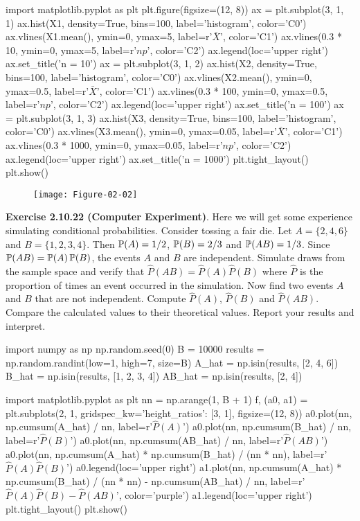 \begin{python}
import matplotlib.pyplot as plt
plt.figure(figsize=(12, 8))
ax = plt.subplot(3, 1, 1)
ax.hist(X1, density=True, bins=100, label='histogram', color='C0')
ax.vlines(X1.mean(), ymin=0, ymax=5, label=r'$\bar{X}$', color='C1')
ax.vlines(0.3 * 10, ymin=0, ymax=5, label=r'$np$', color='C2')
ax.legend(loc='upper right')
ax.set_title('n = 10')
ax = plt.subplot(3, 1, 2)
ax.hist(X2, density=True, bins=100, label='histogram', color='C0')
ax.vlines(X2.mean(), ymin=0, ymax=0.5, label=r'$\bar{X}$', color='C1')
ax.vlines(0.3 * 100, ymin=0, ymax=0.5, label=r'$np$', color='C2')
ax.legend(loc='upper right')
ax.set_title('n = 100')
ax = plt.subplot(3, 1, 3)
ax.hist(X3, density=True, bins=100, label='histogram', color='C0')
ax.vlines(X3.mean(), ymin=0, ymax=0.05, label=r'$\bar{X}$', color='C1')
ax.vlines(0.3 * 1000, ymin=0, ymax=0.05, label=r'$np$', color='C2')
ax.legend(loc='upper right')
ax.set_title('n = 1000')
plt.tight_layout()
plt.show()
\end{python}

\begin{figure}[H]
\centering
\texttt{[image: Figure-02-02]}
\end{figure}


\textbf{Exercise 2.10.22 (Computer Experiment)}. Here we will get some experience simulating conditional probabilities. Consider tossing a fair die. Let \(A = \{2, 4, 6\}\) and \(B = \{1, 2, 3, 4\}\). Then \(\operatorname{\mathbb{P}}(A) = 1/2\), \(\operatorname{\mathbb{P}}(B) = 2/3\) and \(\operatorname{\mathbb{P}}(AB) = 1/3\). Since \(\operatorname{\mathbb{P}}(AB) = \operatorname{\mathbb{P}}(A) \operatorname{\mathbb{P}}(B)\), the events \(A\) and \(B\) are independent. Simulate draws from the sample space and verify that \(\hat{P}(AB) = \hat{P}(A) \hat{P}(B)\) where \(\hat{P}\) is the proportion of times an event occurred in the simulation. Now find two events \(A\) and \(B\) that are not independent. Compute \(\hat{P}(A)\), \(\hat{P}(B)\) and \(\hat{P}(AB)\). Compare the calculated values to their theoretical values. Report your results and interpret.

\begin{python}
import numpy as np
np.random.seed(0)
B = 10000
results = np.random.randint(low=1, high=7, size=B)
A_hat = np.isin(results, [2, 4, 6])
B_hat = np.isin(results, [1, 2, 3, 4])
AB_hat = np.isin(results, [2, 4])
\end{python}

\begin{python}
import matplotlib.pyplot as plt
nn = np.arange(1, B + 1)
f, (a0, a1) = plt.subplots(2, 1, gridspec_kw={'height_ratios': [3, 1]}, figsize=(12, 8))
a0.plot(nn, np.cumsum(A_hat) / nn, label=r'$\hat{P}(A)$')
a0.plot(nn, np.cumsum(B_hat) / nn, label=r'$\hat{P}(B)$')
a0.plot(nn, np.cumsum(AB_hat) / nn, label=r'$\hat{P}(AB)$')
a0.plot(nn, np.cumsum(A_hat) * np.cumsum(B_hat) / (nn * nn), label=r'$\hat{P}(A) \hat{P}(B)$')
a0.legend(loc='upper right')
a1.plot(nn, np.cumsum(A_hat) * np.cumsum(B_hat) / (nn * nn) - np.cumsum(AB_hat) / nn, 
         label=r'$\hat{P}(A) \hat{P}(B)- \hat{P}(AB)$', color='purple')
a1.legend(loc='upper right')
plt.tight_layout()
plt.show()
\end{python}

